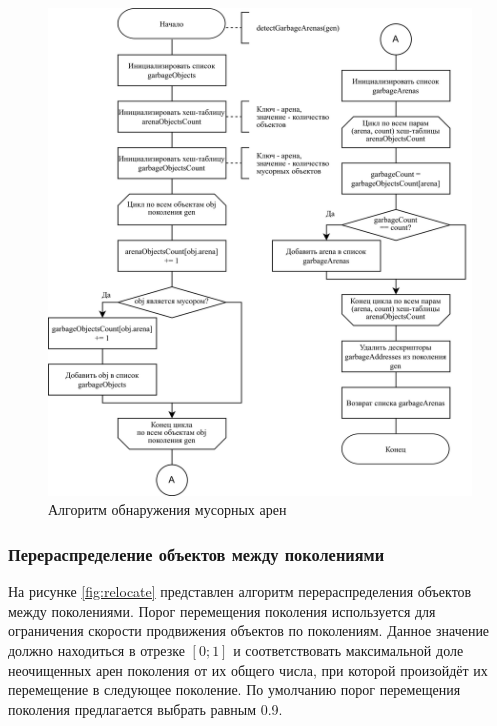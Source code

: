 \begin{figure}[H]
	\centering
	\includegraphics[width=\textwidth]{assets/sweep-2.png}
	\caption{Алгоритм обнаружения мусорных арен}
	\label{fig:sweep-2}
\end{figure}

%

\subsubsection*{Перераспределение объектов между поколениями}

На рисунке \ref{fig:relocate} представлен алгоритм перераспределения объектов между поколениями. Порог перемещения поколения используется для ограничения скорости продвижения объектов по поколениям. Данное значение должно находиться в отрезке $[0; 1]$ и соответствовать максимальной доле неочищенных арен поколения от их общего числа, при которой произойдёт их перемещение в следующее поколение. По умолчанию порог перемещения поколения предлагается выбрать равным 0.9.

